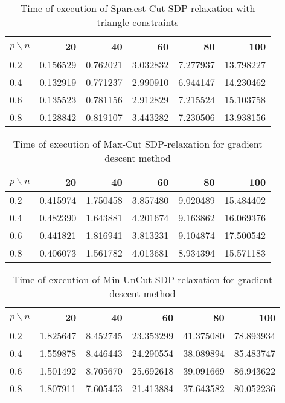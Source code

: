 \documentclass[12pt]{article}
\begin{document}
\begin{table}[H]
	\centering
	\begin{tabular}{|lrrrrr|}
		\toprule
		{$p \backslash n$} &       20  &       40  &       60  &       80  &        100 \\
		\midrule
		0.2 &  0.156529 &  0.762021 &  3.032832 &  7.277937 &  13.798227 \\
		0.4 &  0.132919 &  0.771237 &  2.990910 &  6.944147 &  14.230462 \\
		0.6 &  0.135523 &  0.781156 &  2.912829 &  7.215524 &  15.103758 \\
		0.8 &  0.128842 &  0.819107 &  3.443282 &  7.230506 &  13.938156 \\
		\bottomrule
	\end{tabular}
	\caption{Time of execution of Sparsest Cut SDP-relaxation with triangle constraints}
\end{table}

\begin{table}[H]
	\centering
	\begin{tabular}{|lrrrrr|}
		\toprule
		{$p \backslash n$} &       20  &       40  &       60  &       80  &        100 \\
		\midrule
		0.2 &  0.415974 &  1.750458 &  3.857480 &  9.020489 &  15.484402 \\
		0.4 &  0.482390 &  1.643881 &  4.201674 &  9.163862 &  16.069376 \\
		0.6 &  0.441821 &  1.816941 &  3.813231 &  9.104874 &  17.500542 \\
		0.8 &  0.406073 &  1.561782 &  4.013681 &  8.934394 &  15.571183 \\
		\bottomrule
	\end{tabular}
	\caption{Time of execution of Max-Cut SDP-relaxation for gradient descent method}
\end{table}

\begin{table}[H]
	\centering
	\begin{tabular}{|lrrrrr|}
		\toprule
		{$p \backslash n$} &       20  &       40  &        60  &        80  &        100 \\
		\midrule
		0.2 &  1.825647 &  8.452745 &  23.353299 &  41.375080 &  78.893934 \\
		0.4 &  1.559878 &  8.446443 &  24.290554 &  38.089894 &  85.483747 \\
		0.6 &  1.501492 &  8.705670 &  25.692618 &  39.091669 &  86.943622 \\
		0.8 &  1.807911 &  7.605453 &  21.413884 &  37.643582 &  80.052236 \\
		\bottomrule
	\end{tabular}
	\caption{Time of execution of Min UnCut SDP-relaxation for gradient descent 
		method}
\end{table}
\end{document}
